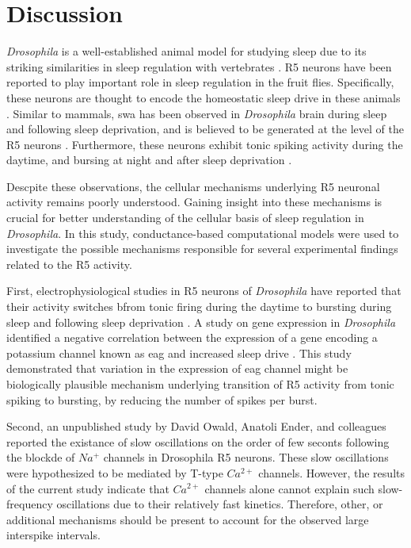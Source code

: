 \documentclass[../main.tex]{subfiles}
\begin{document}
\section{Discussion}

\textit{Drosophila} is a well-established animal model for studying sleep due to its striking similarities in sleep regulation with vertebrates \cite{shaferRegulationDrosophilaSleep2021,andreaniCircadianProgrammingEllipsoid2022}. R5 neurons have been reported to play important role in sleep regulation in the fruit flies. Specifically, these neurons are thought to encode the homeostatic sleep drive in these animals \cite{liuSleepDriveEncoded2016}. Similar to mammals,
\gls{swa} has been observed in \textit{Drosophila} brain during sleep and following sleep deprivation, and is believed to be generated at the level of the R5 neurons \cite{raccugliaNetworkSpecificSynchronizationElectrical2019}. Furthermore, these neurons exhibit tonic spiking activity during the daytime, and bursing at night and after sleep deprivation \cite{suarez-grimaltNeuralArchitectureSleep2021,liuSleepDriveEncoded2016}. 

Descpite these observations, the cellular mechanisms underlying R5 neuronal activity remains poorly understood. Gaining insight into these mechanisms is crucial for better understanding of the cellular basis of sleep regulation in \textit{Drosophila}.
In this study, conductance-based computational models were used to investigate the possible mechanisms responsible for several experimental findings related to the R5 activity.

First, electrophysiological studies in R5 neurons of \textit{Drosophila} have reported that their activity switches bfrom tonic firing during the daytime to bursting during sleep and following sleep deprivation \parencite{liuSleepDriveEncoded2016,suarez-grimaltNeuralArchitectureSleep2021}. A study on gene expression in \textit{Drosophila} identified a negative correlation between the expression of a gene encoding a potassium channel known as \gls{eag} and increased sleep drive \cite{doppSinglecellTranscriptomicsReveals2024}. This study demonstrated that variation in the expression of \gls{eag} channel might be biologically plausible mechanism underlying transition of R5 activity from tonic spiking to bursting, by reducing the number of spikes per burst.

Second, an unpublished study by David Owald, Anatoli Ender, and colleagues reported the existance of slow oscillations on the order of few seconts following the blockde of $Na^+$ channels in Drosophila R5 neurons. These slow oscillations were hypothesized to be mediated by T-type $Ca^{2+}$ channels. However, the results of the current study indicate that $Ca^{2+}$ channels alone cannot explain such slow-frequency oscillations due to their relatively fast kinetics. Therefore, other, or additional mechanisms should be present to account for the observed large interspike intervals.
\end{document}
